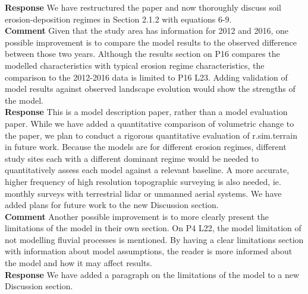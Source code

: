 \documentclass[gmd, manuscript]{copernicus}
\begin{document}
\noindent\textbf{Response}
We have restructured the paper and now thoroughly discuss soil erosion-deposition regimes in Section 2.1.2 with equations 6-9. 
\\

\noindent\textbf{Comment}
Given that the study area has information for 2012 and 2016, one possible improvement is to compare the model results to the observed difference between those two years. Although the results section on P16 compares the modelled characteristics with typical erosion regime characteristics, the comparison to the 2012-2016 data is limited to P16 L23. Adding validation of model results against observed landscape evolution would show the strengths of the model.
\\

\noindent\textbf{Response}
This is a model description paper, rather than a model evaluation paper. While we have added a quantitative comparison of volumetric change to the paper, we plan to conduct a rigorous quantitative evaluation of r.sim.terrain in future work. Because the models are for different erosion regimes, different study sites each with a different dominant regime would be needed to quantitatively assess each model against a relevant baseline. A more accurate, higher frequency of high resolution topographic surveying is also needed, ie. monthly surveys with terrestrial lidar or unmanned aerial systems. We have added plans for future work to the new Discussion section.
\\

\noindent\textbf{Comment}
Another possible improvement is to more clearly present the limitations of the model in their own section. On P4 L22, the model limitation of not modelling fluvial processes is mentioned. By having a clear limitations section with information about model assumptions, the reader is more informed about the model and how it may affect results.
\\

\noindent\textbf{Response}
We have added a paragraph on the limitations of the model to a new Discussion section.
\\
\end{document}
